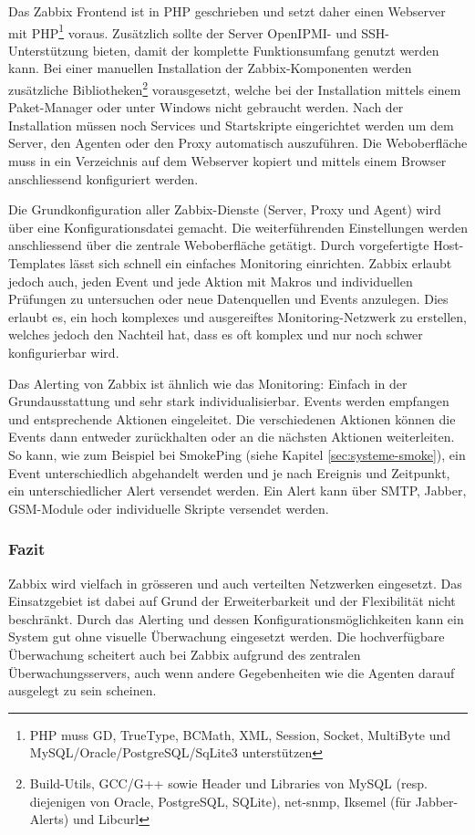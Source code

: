   Das Zabbix Frontend ist in PHP geschrieben und setzt daher einen Webserver mit PHP\footnote{\label{foot:zabbix-php}PHP muss GD, TrueType, BCMath, XML, Session, Socket, MultiByte und MySQL/Oracle/PostgreSQL/SqLite3 unterst\"utzen} voraus. Zus\"atzlich sollte der Server OpenIPMI- und SSH-Unterst\"utzung bieten, damit der komplette Funktionsumfang genutzt werden kann. Bei einer manuellen Installation der Zabbix-Komponenten werden zus\"atzliche Bibliotheken\footnote{\label{foot:zabbix-libs}Build-Utils, GCC/G++ sowie Header und Libraries von MySQL (resp. diejenigen von Oracle, PostgreSQL, SQLite), net-snmp, Iksemel (f\"ur Jabber-Alerts) und Libcurl} vorausgesetzt, welche bei der Installation mittels einem Paket-Manager oder unter Windows nicht gebraucht werden. Nach der Installation m\"ussen noch Services und Startskripte eingerichtet werden um dem Server, den Agenten oder den Proxy automatisch auszuf\"uhren. Die Weboberfl\"ache muss in ein Verzeichnis auf dem Webserver kopiert und mittels einem Browser anschliessend konfiguriert werden.

  Die Grundkonfiguration aller Zabbix-Dienste (Server, Proxy und Agent) wird \"uber eine Konfigurationsdatei gemacht. Die weiterf\"uhrenden Einstellungen werden anschliessend \"uber die zentrale Weboberfl\"ache get\"atigt. Durch vorgefertigte Host-Templates l\"asst sich schnell ein einfaches Monitoring einrichten. Zabbix erlaubt jedoch auch, jeden Event und jede Aktion mit Makros und individuellen Pr\"ufungen zu untersuchen oder neue Datenquellen und Events anzulegen. Dies erlaubt es, ein hoch komplexes und ausgereiftes Monitoring-Netzwerk zu erstellen, welches jedoch den Nachteil hat, dass es oft komplex und nur noch schwer konfigurierbar wird.

  Das Alerting von Zabbix ist \"ahnlich wie das Monitoring: Einfach in der Grundausstattung und sehr stark individualisierbar. Events werden empfangen und entsprechende Aktionen eingeleitet. Die verschiedenen Aktionen k\"onnen die Events dann entweder zur\"uckhalten oder an die n\"achsten Aktionen weiterleiten. So kann, wie zum Beispiel bei SmokePing (siehe Kapitel \ref{sec:systeme-smoke}), ein Event unterschiedlich abgehandelt werden und je nach Ereignis und Zeitpunkt, ein unterschiedlicher Alert versendet werden. Ein Alert kann \"uber SMTP, Jabber, GSM-Module oder individuelle Skripte versendet werden.

\subsubsection{Fazit} \label{sec:systeme-zabbix-fazit}
  Zabbix wird vielfach in gr\"osseren und auch verteilten Netzwerken eingesetzt. Das Einsatzgebiet ist dabei auf Grund der Erweiterbarkeit und der Flexibilit\"at nicht beschr\"ankt. Durch das Alerting und dessen Konfigurationsm\"oglichkeiten kann ein System gut ohne visuelle \"Uberwachung eingesetzt werden. Die hochverf\"ugbare \"Uberwachung scheitert auch bei Zabbix aufgrund des zentralen \"Uberwachungsservers, auch wenn andere Gegebenheiten wie die Agenten darauf ausgelegt zu sein scheinen.


